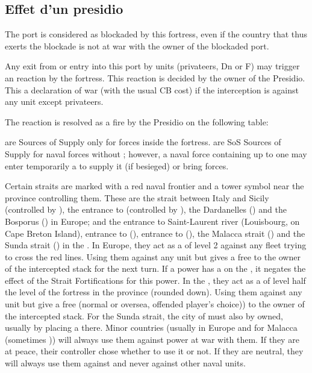 \subsection{Effet d'un presidio}\label{chMilitary:Presidios}

\bparag The port is considered as blockaded by this fortress, even if the
country that thus exerts the blockade is not at war with the owner of
the blockaded port.

\bparag Any exit from or entry into this port by units (privateers, Dn
or F) may trigger an reaction by the fortress. This reaction is decided
by the owner of the Presidio. This a declaration of war (with the usual
CB cost) if the interception is against any unit except privateers.

\bparag The reaction is resolved as a fire by the Presidio on the following table:
\interceptionb

\bparag \Presidios are Sources of Supply only for forces inside the fortress.
\bparag \Presidios are SoS Sources of Supply for naval forces without \FLEET;
however, a naval force containing up to one \FLEET may enter temporarily a
\Presidio to supply it (if besieged) or bring forces.

\label{chMilitary:Strait Fortifications}Certain
straits are marked with a red naval frontier and a tower symbol near
the province controlling them. These are the strait between Italy and
Sicily (controlled by ), the entrance to
 (controlled by ), the
Dardanelles () and the Bosporus
() in Europe; and the entrance to Saint-Laurent river
(Louisbourg, on Cape Breton Island), entrance to 
(), entrance to  (),
the Malacca strait () and the Sunda strait
() in the \ROTW.
\bparag In Europe, they act as a \Presidio of level 2 against any fleet
trying to cross the red lines. Using them against any unit but \corsaire
gives a free \CB to the owner of the intercepted stack for the next
turn.
\bparag If a power has a \Presidio on the , it
negates the effect of the Strait Fortifications for this power.
\bparag In the \ROTW, they act as a \Presidio of level half the level of
the fortress in the province (rounded down). Using them against any unit
but \corsaire give a free \CB (normal or oversea, offended player's
choice)) to the owner of the intercepted stack.
\bparag For the Sunda strait, the city of  must also by
owned, usually by placing a \COL there.
\bparag Minor countries (usually  in Europe and
 for Malacca (sometimes )) will always use
them against power at war with them. If they are at peace, their
controller chose whether to use it or not. If they are neutral, they
will always use them against \corsaire and never against other naval
units.

